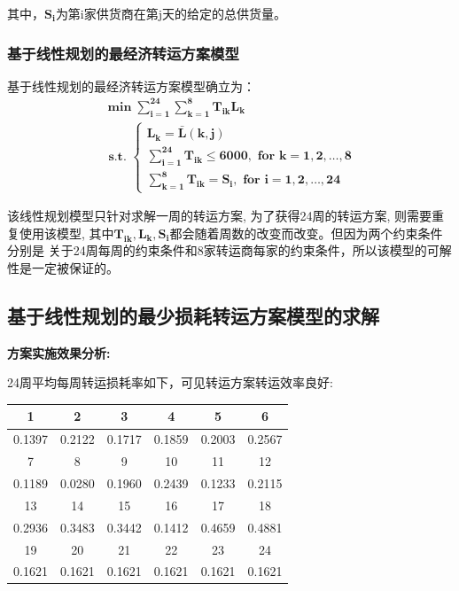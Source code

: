 \documentclass[UTF8]{ctexart}
\begin{document}
其中，$\mathbf{S_{i}}$为第i家供货商在第j天的给定的总供货量。
\subsubsection{基于线性规划的最经济转运方案模型}
基于线性规划的最经济转运方案模型确立为：
\begin{equation}
	\mathbf{\begin{array}{c}
	\min \sum_{i=1}^{24} \sum_{k=1}^{8} T_{i k} L_{k} \\
	\text { s.t. }\left\{\begin{array}{l}
	L_{k}=\bar{L}(k, j) \\
	\sum_{i=1}^{24} T_{i k} \leqslant 6000, \text { for } k=1,2, \ldots, 8 \\
	\sum_{k=1}^{8} T_{i k}=S_{i}, \text { for } i=1,2, \ldots, 24
	\end{array}\right.
	\end{array}}
\end{equation}

该线性规划模型只针对求解一周的转运方案, 为了获得24周的转运方案, 则需要重复使用该模型, 
其中$\mathbf{T_{ik},L_{k}, S_{i}}$都会随着周数的改变而改变。但因为两个约束条件分别是
关于24周每周的约束条件和8家转运商每家的约束条件，所以该模型的可解性是一定被保证的。

\subsection{基于线性规划的最少损耗转运方案模型的求解}
\textbf{方案实施效果分析:}

24周平均每周转运损耗率如下，可见转运方案转运效率良好:
\begin{center}
	\begin{tabular}{||c c c c c c ||}
		\hline 
		1 & 2 & 3 & 4 & 5 & 6   \\
		\hline 
		0.1397 & 0.2122 & 0.1717 & 0.1859 & 0.2003 & 0.2567 \\
		\hline 
		7 & 8 & 9 & 10 & 11 & 12 \\
		\hline
		0.1189 & 0.0280 & 0.1960 & 0.2439 & 0.1233 & 0.2115 \\
		\hline 
		13 & 14 & 15 & 16 & 17 & 18 \\
		\hline 
		0.2936 & 0.3483 & 0.3442 & 0.1412 & 0.4659 & 0.4881 \\
		\hline 
		19 & 20 & 21 & 22 & 23 & 24 \\
		\hline 
		0.1621 & 0.1621 & 0.1621 & 0.1621 & 0.1621 & 0.1621 \\
		\hline
	\end{tabular}
\end{center}
\end{document}
